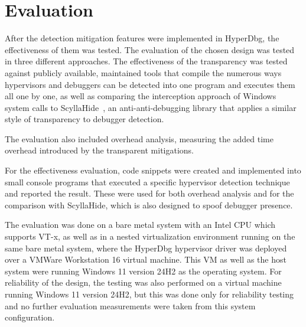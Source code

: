 \section{Evaluation}\label{s:evaluation}

After the detection mitigation features were implemented in HyperDbg, the effectiveness of them was tested. The evaluation of the chosen design was tested in three 
different approaches. The effectiveness of the transparency was tested against publicly available, maintained tools that compile the numerous ways hypervisors 
and debuggers can be detected into one program and executes them all one by one, as well as comparing the interception approach of Windows system calls to 
ScyllaHide~\cite{scyllahide}, an anti-anti-debugging library that applies 
a similar style of transparency to debugger detection.

The evaluation also included overhead analysis, measuring the added time overhead introduced by the transparent mitigations.

For the effectiveness evaluation, code snippets were created and implemented into small console programs that executed a specific hypervisor detection technique 
and reported the result. These were used for both overhead analysis and for the comparison with ScyllaHide, which is also designed to spoof debugger presence.

The evaluation was done on a bare metal system with an Intel CPU which supports VT-x, as well as in a nested virtualization environment running on the same bare metal system, 
where the HyperDbg hypervisor driver was deployed over a VMWare Workstation 16 virtual machine. This VM as well as the host system were running Windows 11 version 24H2 as the operating system. 
For reliability of the design, the testing was also performed on a virtual machine running Windows 11 version 24H2, 
but this was done only for reliability testing and no further evaluation measurements were taken from this system configuration. 

